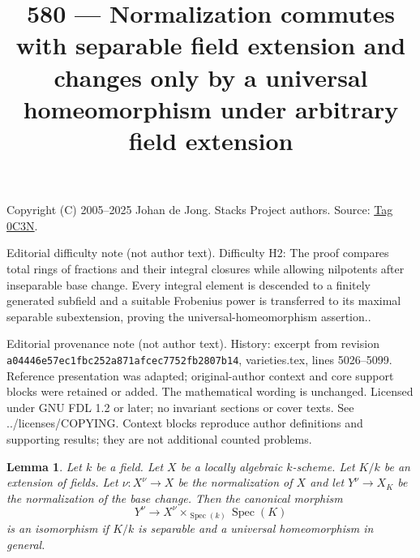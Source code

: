 \documentclass{amsart}
\theoremstyle{plain}
\newtheorem{lemma}[subsection]{Lemma}
\theoremstyle{definition}
\theoremstyle{remark}
\numberwithin{equation}{subsection}
\def\Spec{\mathop{\mathrm{Spec}}}
\begin{document}
\title[Stacks Project, Tag 0C3N]{580 --- Normalization commutes with separable field extension and changes only by a universal homeomorphism under arbitrary field extension}
\maketitle
\noindent Copyright (C) 2005--2025 Johan de Jong. Stacks Project authors. Source: \href{https://stacks.math.columbia.edu/tag/0C3N}{Tag 0C3N}.

\noindent Editorial difficulty note (not author text). Difficulty H2: The proof compares total rings of fractions and their integral closures while allowing nilpotents after inseparable base change. Every integral element is descended to a finitely generated subfield and a suitable Frobenius power is transferred to its maximal separable subextension, proving the universal-homeomorphism assertion..

\noindent Editorial provenance note (not author text). History: excerpt from revision \texttt{a0444\allowbreak 6e57e\allowbreak c1fbc\allowbreak 252a8\allowbreak 71afc\allowbreak ec775\allowbreak 2fb28\allowbreak 07b14}, varieties.tex, lines 5026--5099. Reference presentation was adapted; original-author context and core support blocks were retained or added. The mathematical wording is unchanged. Licensed under GNU FDL 1.2 or later; no invariant sections or cover texts. See ../licenses/COPYING. Context blocks reproduce author definitions and supporting results; they are not additional counted problems.

\begin{lemma}
\label{lemma-normalization-and-change-of-fields}
Let $k$ be a field. Let $X$ be a locally algebraic $k$-scheme.
Let $K/k$ be an extension of fields. Let $\nu : X^\nu \to X$
be the normalization of $X$ and let $Y^\nu \to X_K$ be the
normalization of the base change. Then the canonical morphism
$$
Y^\nu \longrightarrow X^\nu \times_{\Spec(k)} \Spec(K)
$$
is an isomorphism if $K/k$ is separable and a universal homeomorphism
in general.
\end{lemma}
\end{document}
